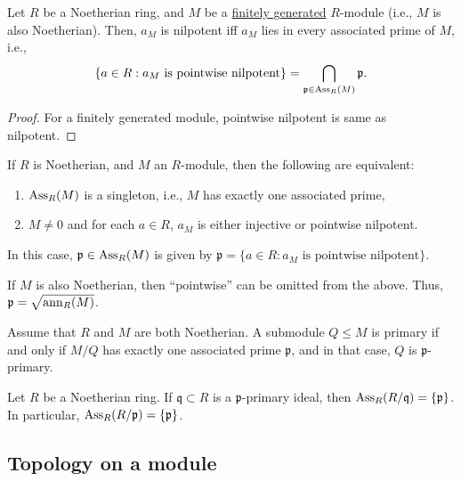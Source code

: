 \begin{cor}
	Let $R$ be a Noetherian ring, and $M$ be a \underline{finitely generated} $R$-module (i.e., $M$ is also Noetherian). Then, $a_{M}$ is nilpotent iff $a_{M}$ lies in every associated prime of $M$, i.e.,
	\begin{equation*} 
		\{a \in R : a_{M} \text{ is pointwise nilpotent}\} = \bigcap_{\mathfrak{p} \in \operatorname{Ass}_{R}(M)} \mathfrak{p}.
	\end{equation*}
\end{cor}
\begin{proof} 
	For a finitely generated module, pointwise nilpotent is same as nilpotent.
\end{proof}

\begin{cor} \label{cor:noetherian-unique-associated-prime}
	If $R$ is Noetherian, and $M$ an $R$-module, then the following are equivalent:
	\begin{enumerate}
		\item $\operatorname{Ass}_{R}(M)$ is a singleton, i.e., $M$ has exactly one associated prime,
		\item $M \neq 0$ and for each $a \in R$, $a_{M}$ is either injective or pointwise nilpotent.
	\end{enumerate}
	In this case, $\mathfrak{p} \in \operatorname{Ass}_{R}(M)$ is given by $\mathfrak{p} = \{a \in R : a_{M} \text{ is pointwise nilpotent}\}$. 

	If $M$ is also Noetherian, then ``pointwise'' can be omitted from the above. Thus, $\mathfrak{p} = \sqrt{\operatorname{ann}_{R}(M)}$.
\end{cor}

\begin{cor}
	Assume that $R$ and $M$ are both Noetherian. A submodule $Q \le M$ is primary if and only if $M/Q$ has exactly one associated prime $\mathfrak{p}$, and in that case, $Q$ is $\mathfrak{p}$-primary.
\end{cor}

\begin{ex} \label{ex:associated-primes-primary-quotient}
	Let $R$ be a Noetherian ring. If $\mathfrak{q} \subset R$ is a $\mathfrak{p}$-primary ideal, then $\operatorname{Ass}_{R}(R/\mathfrak{q}) = \{\mathfrak{p}\}$. In particular, $\operatorname{Ass}_{R}(R/\mathfrak{p}) = \{\mathfrak{p}\}$.
\end{ex}

\subsection{Topology on a module} \label{subsec:topology-module}
